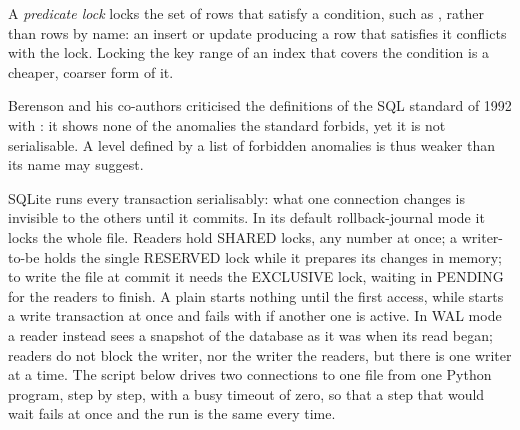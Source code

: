 \begin{definition}\label{def:b3:transactions-and-recovery:isolation}
A \emph{predicate lock} locks the set of rows that satisfy a condition, such as , rather than rows by name: an insert or update producing a row that satisfies it conflicts with the lock. Locking the key range of an index that covers the condition is a cheaper, coarser form of it.
\end{definition}

Berenson and his co-authors criticised the definitions of the SQL standard of 1992 with : it shows none of the anomalies the standard forbids, yet it is not serialisable. %
A level defined by a list of forbidden anomalies is thus weaker than its name may suggest.

SQLite runs every transaction serialisably: what one connection changes is invisible to the others until it commits. %
In its default rollback-journal mode it locks the whole file. Readers hold SHARED locks, any number at once; a writer-to-be holds the single RESERVED lock while it prepares its changes in memory; to write the file at commit it needs the EXCLUSIVE lock, waiting in PENDING for the readers to finish. %
A plain  starts nothing until the first access, while  starts a write transaction at once and fails with  if another one is active. %
In WAL mode a reader instead sees a snapshot of the database as it was when its read began; readers do not block the writer, nor the writer the readers, but there is one writer at a time. %
The script below drives two connections to one file from one Python program, step by step, with a busy timeout of zero, so that a step that would wait fails at once and the run is the same every time.

\label{lst:b3:transactions-and-recovery:sqlite}

\label{out:b3:transactions-and-recovery:sqlite}

